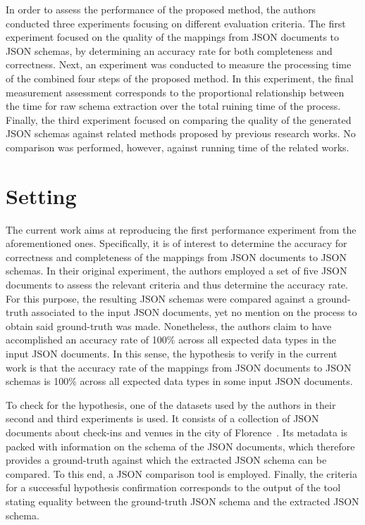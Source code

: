 \documentclass[sigconf, nonacm]{acmart}
\begin{document}
In order to assess the performance of the proposed method, the authors conducted three experiments focusing on different evaluation criteria. The first experiment focused on the quality of the mappings from JSON documents to JSON schemas, by determining an accuracy rate for both completeness and correctness. Next, an experiment was conducted to measure the processing time of the combined four steps of the proposed method. In this experiment, the final measurement assessment corresponds to the proportional relationship between the time for raw schema extraction over the total ruining time of the process. Finally, the third experiment focused on comparing the quality of the generated JSON schemas against related methods proposed by previous research works. No comparison was performed, however, against running time of the related works.

\section{Setting}

The current work aims at reproducing the first performance experiment from the aforementioned ones. Specifically, it is of interest to determine the accuracy for correctness and completeness of the mappings from JSON documents to JSON schemas. In their original experiment, the authors employed a set of five JSON documents to assess the relevant criteria and thus determine the accuracy rate. For this purpose, the resulting JSON schemas were compared against a ground-truth associated to the input JSON documents, yet no mention on the process to obtain said ground-truth was made. Nonetheless, the authors claim to have accomplished an accuracy rate of 100\% across all expected data types in the input JSON documents. In this sense, the hypothesis to verify in the current work is that the accuracy rate of the mappings from JSON documents to JSON schemas is 100\% across all expected data types in some input JSON documents.

To check for the hypothesis, one of the datasets used by the authors in their second and third experiments is used. It consists of a collection of JSON documents about check-ins and venues in the city of Florence~\cite{emre2017}. Its metadata is packed with information on the schema of the JSON documents, which therefore provides a ground-truth against which the extracted JSON schema can be compared. To this end, a JSON comparison tool is employed. Finally, the criteria for a successful hypothesis confirmation corresponds to the output of the tool stating equality between the ground-truth JSON schema and the extracted JSON schema.



\end{document}

